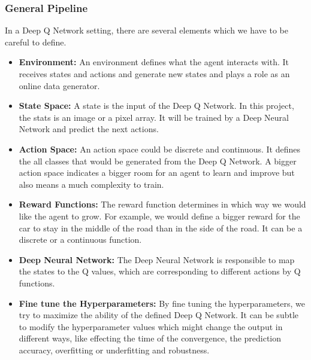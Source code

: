 \subsubsection{General Pipeline}

In a Deep Q Network setting, there are several elements which we have to be careful to define.

\begin{itemize}
	
    \item \textbf{Environment:} An environment defines what the agent interacts with. It receives states and actions and generate new states and plays a role as an online data generator. 
    \item \textbf{State Space:} A state is the input of the Deep Q Network. In this project, the stats is an image or a pixel array. It will be trained by a Deep Neural Network and predict the next actions.
    \item \textbf{Action Space:} An action space could be discrete and continuous. It defines the all classes that would be generated from the Deep Q Network. A bigger action space indicates a bigger room for an agent to learn and improve but also means a much complexity to train.
    \item \textbf{Reward Functions:} The reward function determines in which way we would like the agent to grow. For example, we would define a bigger reward for the car to stay in the middle of the road than in the side of the road. It can be a discrete or a continuous function.
    \item \textbf{Deep Neural Network:} The Deep Neural Network is responsible to map the states to the Q values, which are corresponding to different actions by Q functions. 
    \item \textbf{Fine tune the Hyperparameters:} By fine tuning the hyperparameters, we try to maximize the ability of the defined Deep Q Network. It can be subtle to modify the hyperparameter values which might change the output in different ways, like effecting the time of the convergence, the prediction accuracy, overfitting or underfitting and robustness.
    
\end{itemize}






